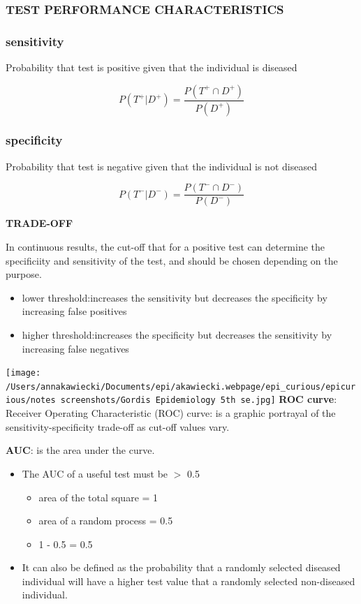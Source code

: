 \documentclass[
]{article}
\providecommand{\tightlist}{%
  \setlength{\itemsep}{0pt}\setlength{\parskip}{0pt}}
\begin{document}
\hypertarget{test-performance-characteristics}{%
\subsubsection{TEST PERFORMANCE
CHARACTERISTICS}\label{test-performance-characteristics}}

\hypertarget{sensitivity}{%
\subsubsection{sensitivity}\label{sensitivity}}

Probability that test is positive given that the individual is diseased

\[P(T^+|D^+)= \frac{P(T^+ \cap D^+)}{P(D^+)}\]

\hypertarget{specificity}{%
\subsubsection{specificity}\label{specificity}}

Probability that test is negative given that the individual is not
diseased

\[P(T^-|D^-)= \frac{P(T^- \cap D^-)}{P(D^-)}\]

\textbf{TRADE-OFF}

In continuous results, the cut-off that for a positive test can
determine the specificiity and sensitivity of the test, and should be
chosen depending on the purpose.

\begin{itemize}
\item
  lower threshold:increases the sensitivity but decreases the
  specificity by increasing false positives
\item
  higher threshold:increases the specificity but decreases the
  sensitivity by increasing false negatives
\end{itemize}

\texttt{[image: /Users/annakawiecki/Documents/epi/akawiecki.webpage/epi\_curious/epicurious/notes screenshots/Gordis Epidemiology 5th se.jpg]}
\textbf{ROC curve}: Receiver Operating Characteristic (ROC) curve: is a
graphic portrayal of the sensitivity-specificity trade-off as cut-off
values vary.

\textbf{AUC}: is the area under the curve.

\begin{itemize}
\tightlist
\item
  The AUC of a useful test must be \(>\) 0.5

  \begin{itemize}
  \tightlist
  \item
    area of the total square = 1
  \item
    area of a random process = 0.5
  \item
    1 - 0.5 = 0.5
  \end{itemize}
\item
  It can also be defined as the probability that a randomly selected
  diseased individual will have a higher test value that a randomly
  selected non-diseased individual.
\end{itemize}
\end{document}
